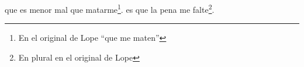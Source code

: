 que es menor mal que matarme\footnote{\textsuperscript{}En el original de Lope ``que me maten''}.
es que la pena me falte\footnote{\textsuperscript{}En plural en el original de Lope}.
